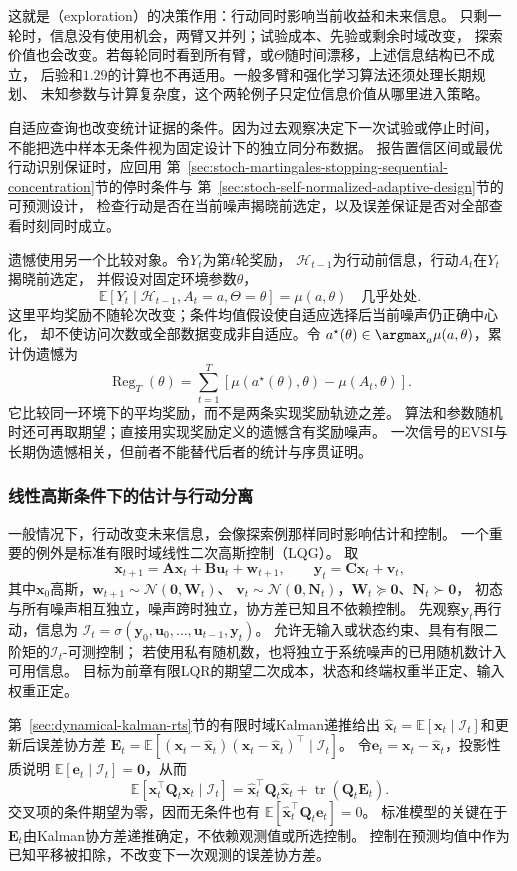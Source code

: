 这就是（exploration）的决策作用：行动同时影响当前收益和未来信息。
只剩一轮时，信息没有使用机会，两臂又并列；试验成本、先验或剩余时域改变，
探索价值也会改变。若每轮同时看到所有臂，或$\Theta$随时间漂移，上述信息结构已不成立，
后验和$1.29$的计算也不再适用。一般多臂和强化学习算法还须处理长期规划、
未知参数与计算复杂度，这个两轮例子只定位信息价值从哪里进入策略。

自适应查询也改变统计证据的条件。因为过去观察决定下一次试验或停止时间，
不能把选中样本无条件视为固定设计下的独立同分布数据。
报告置信区间或最优行动识别保证时，应回用
第~\ref{sec:stoch-martingales-stopping-sequential-concentration}节的停时条件与
第~\ref{sec:stoch-self-normalized-adaptive-design}节的可预测设计，
检查行动是否在当前噪声揭晓前选定，以及误差保证是否对全部查看时刻同时成立。

遗憾使用另一个比较对象。令$Y_t$为第$t$轮奖励，
$\mathcal H_{t-1}$为行动前信息，行动$A_t$在$Y_t$揭晓前选定，
并假设对固定环境参数$\theta$，
\[
  \mathbb E[Y_t\mid\mathcal H_{t-1},A_t=a,\Theta=\theta]
  =\mu(a,\theta)\quad\text{几乎处处}.
\]
这里平均奖励不随轮次改变；条件均值假设使自适应选择后当前噪声仍正确中心化，
却不使访问次数或全部数据变成非自适应。令
$a^\star(\theta)\in\argmax_a\mu(a,\theta)$，累计伪遗憾为
\[
  \operatorname{Reg}_T(\theta)
  =\sum_{t=1}^T[\mu(a^\star(\theta),\theta)-\mu(A_t,\theta)].
\]
它比较同一环境下的平均奖励，而不是两条实现奖励轨迹之差。
算法和参数随机时还可再取期望；直接用实现奖励定义的遗憾含有奖励噪声。
一次信号的EVSI与长期伪遗憾相关，但前者不能替代后者的统计与序贯证明。

\subsubsection{线性高斯条件下的估计与行动分离}

一般情况下，行动改变未来信息，会像探索例那样同时影响估计和控制。
一个重要的例外是标准有限时域线性二次高斯控制（LQG）。
取
\[
  \bm x_{t+1}=\bm A\bm x_t+\bm B\bm u_t+\bm w_{t+1},
  \qquad \bm y_t=\bm C\bm x_t+\bm v_t,
\]
其中$\bm x_0$高斯，$\bm w_{t+1}\sim\mathcal N(\bm0,\bm W_t)$、
$\bm v_t\sim\mathcal N(\bm0,\bm N_t)$，$\bm W_t\succeq\bm0$、$\bm N_t\succ\bm0$，
初态与所有噪声相互独立，噪声跨时独立，协方差已知且不依赖控制。
先观察$\bm y_t$再行动，信息为
$\mathcal I_t=\sigma(\bm y_0,\bm u_0,\ldots,\bm u_{t-1},\bm y_t)$。
允许无输入或状态约束、具有有限二阶矩的$\mathcal I_t$-可测控制；
若使用私有随机数，也将独立于系统噪声的已用随机数计入可用信息。
目标为前章有限LQR的期望二次成本，状态和终端权重半正定、输入权重正定。

第~\ref{sec:dynamical-kalman-rts}节的有限时域Kalman递推给出
$\widehat{\bm x}_t=\mathbb E[\bm x_t\mid\mathcal I_t]$和更新后误差协方差
$\bm E_t=\mathbb E[(\bm x_t-\widehat{\bm x}_t)
(\bm x_t-\widehat{\bm x}_t)^\top\mid\mathcal I_t]$。
令$\bm e_t=\bm x_t-\widehat{\bm x}_t$，投影性质说明
$\mathbb E[\bm e_t\mid\mathcal I_t]=\bm0$，从而
\[
  \mathbb E[\bm x_t^\top\bm Q_t\bm x_t\mid\mathcal I_t]
  =\widehat{\bm x}_t^\top\bm Q_t\widehat{\bm x}_t
    +\operatorname{tr}(\bm Q_t\bm E_t).
\]
交叉项的条件期望为零，因而无条件也有
$\mathbb E[\widehat{\bm x}_t^\top\bm Q_t\bm e_t]=0$。
标准模型的关键在于$\bm E_t$由Kalman协方差递推确定，不依赖观测值或所选控制。
控制在预测均值中作为已知平移被扣除，不改变下一次观测的误差协方差。

